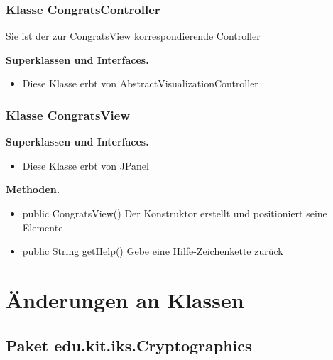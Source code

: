 \documentclass{article}
\begin{document}
	\subsubsection{Klasse CongratsController}
    Sie ist der zur CongratsView korrespondierende Controller\newline
    
	    \textbf{Superklassen und Interfaces.}\newline
        \begin{itemize}
            \item Diese Klasse erbt von AbstractVisualizationController \newline
           \end{itemize}

	\subsubsection{Klasse CongratsView}

	    \textbf{Superklassen und Interfaces.}\newline
        \begin{itemize}
            \item Diese Klasse erbt von JPanel \newline
           \end{itemize}

    \textbf{Methoden.}\newline
	   \begin{itemize}
           \item public CongratsView() \newline
               Der Konstruktor erstellt und positioniert seine Elemente\newline
           \item public String getHelp() \newline
               Gebe eine Hilfe-Zeichenkette zurück\newline
           \end{itemize}


\section{Änderungen an Klassen}

  \subsection{Paket edu.kit.iks.Cryptographics}
\end{document}
